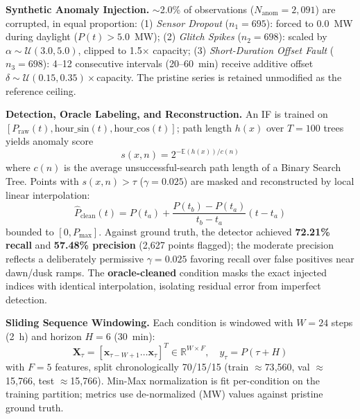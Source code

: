 \documentclass[runningheads]{llncs}
\begin{document}
\noindent\textbf{Synthetic Anomaly Injection.} $\sim$2.0\% of observations ($N_{\text{anom}}=2{,}091$) are corrupted, in equal proportion: (1) \emph{Sensor Dropout} ($n_1=695$): forced to 0.0~MW during daylight ($P(t)>5.0$~MW); (2) \emph{Glitch Spikes} ($n_2=698$): scaled by $\alpha\sim\mathcal{U}(3.0,5.0)$, clipped to 1.5$\times$ capacity; (3) \emph{Short-Duration Offset Fault} ($n_3=698$): 4--12 consecutive intervals (20--60~min) receive additive offset $\delta\sim\mathcal{U}(0.15,0.35)\times$capacity. The pristine series is retained unmodified as the reference ceiling.

\noindent\textbf{Detection, Oracle Labeling, and Reconstruction.} An IF is trained on $[P_{\text{raw}}(t),\text{hour\_sin}(t),\text{hour\_cos}(t)]$; path length $h(x)$ over $T=100$ trees yields anomaly score
\begin{equation}
s(x,n)=2^{-\mathbb{E}(h(x))/c(n)}
\end{equation}
where $c(n)$ is the average unsuccessful-search path length of a Binary Search Tree. Points with $s(x,n)>\tau$ ($\gamma=0.025$) are masked and reconstructed by local linear interpolation:
\begin{equation}
\hat{P}_{\text{clean}}(t)=P(t_a)+\frac{P(t_b)-P(t_a)}{t_b-t_a}(t-t_a)
\end{equation}
bounded to $[0,P_{\max}]$. Against ground truth, the detector achieved \textbf{72.21\% recall} and \textbf{57.48\% precision} (2{,}627 points flagged); the moderate precision reflects a deliberately permissive $\gamma=0.025$ favoring recall over false positives near dawn/dusk ramps. The \textbf{oracle-cleaned} condition masks the exact injected indices with identical interpolation, isolating residual error from imperfect detection.

\noindent\textbf{Sliding Sequence Windowing.} Each condition is windowed with $W=24$ steps (2~h) and horizon $H=6$ (30~min):
\begin{equation}
\mathbf{X}_\tau=[\mathbf{x}_{\tau-W+1}\ldots\mathbf{x}_\tau]^T\in\mathbb{R}^{W\times F},\quad y_\tau=P(\tau+H)
\end{equation}
with $F=5$ features, split chronologically 70/15/15 (train $\approx$73{,}560, val $\approx$15{,}766, test $\approx$15{,}766). Min-Max normalization is fit per-condition on the training partition; metrics use de-normalized (MW) values against pristine ground truth.
\end{document}
